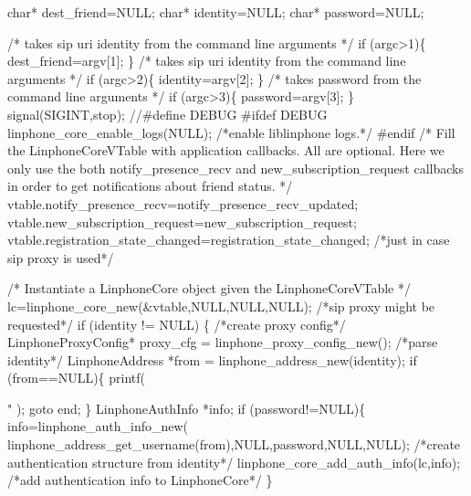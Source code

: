 \begin{DoxyCodeInclude}
{{{        \textcolor{keywordtype}{char}* dest\_friend=NULL;
        \textcolor{keywordtype}{char}* identity=NULL;
        \textcolor{keywordtype}{char}* password=NULL;

        \textcolor{comment}{/* takes   sip uri  identity from the command line arguments */}
        \textcolor{keywordflow}{if} (argc>1)\{
                dest\_friend=argv[1];
        \}
        \textcolor{comment}{/* takes   sip uri  identity from the command line arguments */}
        \textcolor{keywordflow}{if} (argc>2)\{
                identity=argv[2];
        \}
        \textcolor{comment}{/* takes   password from the command line arguments */}
        \textcolor{keywordflow}{if} (argc>3)\{
                password=argv[3];
        \}
        signal(SIGINT,stop);
\textcolor{comment}{//#define DEBUG}
\textcolor{preprocessor}{#ifdef DEBUG}
\textcolor{preprocessor}{}        linphone_core_enable_logs(NULL); \textcolor{comment}{/*enable liblinphone logs.*/}
\textcolor{preprocessor}{#endif}
\textcolor{preprocessor}{}        \textcolor{comment}{/* }
\textcolor{comment}{         Fill the LinphoneCoreVTable with application callbacks.}
\textcolor{comment}{         All are optional. Here we only use the both notify\_presence\_recv and new\_subscription\_request
       callbacks}
\textcolor{comment}{         in order to get notifications about friend status.}
\textcolor{comment}{         */}
        vtable.notify_presence_recv=notify\_presence\_recv\_updated;
        vtable.new_subscription_request=new\_subscription\_request;
        vtable.registration_state_changed=registration\_state\_changed; \textcolor{comment}{/*just in case sip proxy is used*/}

        \textcolor{comment}{/*}
\textcolor{comment}{         Instantiate a LinphoneCore object given the LinphoneCoreVTable}
\textcolor{comment}{        */}
        lc=linphone_core_new(&vtable,NULL,NULL,NULL);
        \textcolor{comment}{/*sip proxy might be requested*/}
        \textcolor{keywordflow}{if} (identity != NULL)  \{
                \textcolor{comment}{/*create proxy config*/}
                LinphoneProxyConfig* proxy\_cfg = linphone_proxy_config_new();
                \textcolor{comment}{/*parse identity*/}
                LinphoneAddress *from = linphone_address_new(identity);
                \textcolor{keywordflow}{if} (from==NULL)\{
                        printf(\textcolor{stringliteral}{"%
      );
                        \textcolor{keywordflow}{goto} end;
                \}
                LinphoneAuthInfo *info;
                \textcolor{keywordflow}{if} (password!=NULL)\{
                        info=linphone_auth_info_new(
      linphone_address_get_username(from),NULL,password,NULL,NULL); \textcolor{comment}{/*create authentication structure from
       identity*/}
                        linphone_core_add_auth_info(lc,info); \textcolor{comment}{/*add authentication info to LinphoneCore*/}
                \}

}}}}
\end{DoxyCodeInclude}

